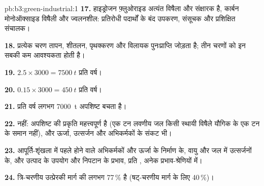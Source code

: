 \begin{solution}{pb:b3:green-industrial:1}
\textbf{17.} हाइड्रोजन फ़्लुओराइड अत्यंत विषैला और संक्षारक है, कार्बन मोनोऑक्साइड विषैली और
ज्वलनशील: प्रतिरोधी पदार्थों के बंद उपकरण, संसूचक और प्रशिक्षित
संचालक।

\textbf{18.} प्रत्येक चरण तापन, शीतलन, पृथक्करण और विलायक पुनःप्राप्ति जोड़ता है; तीन
चरणों को इन सबकी कम आवश्यकता होती है।

\textbf{19.} $2.5 \times 3000 = \qty{7500}{t}$ प्रति वर्ष।

\textbf{20.} $0.15 \times 3000 = \qty{450}{t}$ प्रति वर्ष।

\textbf{21.} प्रति वर्ष लगभग \qty{7000}{t} अपशिष्ट बचता है।

\textbf{22.} नहीं: अपशिष्ट की प्रकृति महत्त्वपूर्ण है (एक टन लवणीय जल किसी स्थायी विषैले यौगिक के एक टन
के समान नहीं), और ऊर्जा, उत्सर्जन और अभिकर्मकों के संकट भी।

\textbf{23.} आपूर्ति-शृंखला में पहले होने वाले अभिकर्मकों और ऊर्जा के निर्माण के, वायु और जल में उत्सर्जनों के, और
उत्पाद के उपयोग और निपटान के प्रभाव, प्रति , अनेक
प्रभाव-श्रेणियों में।

\textbf{24.} त्रि-चरणीय उत्प्रेरकी मार्ग की  लगभग 77\,\% है (षट्-चरणीय मार्ग के लिए
40\,\%)।
\end{solution}
